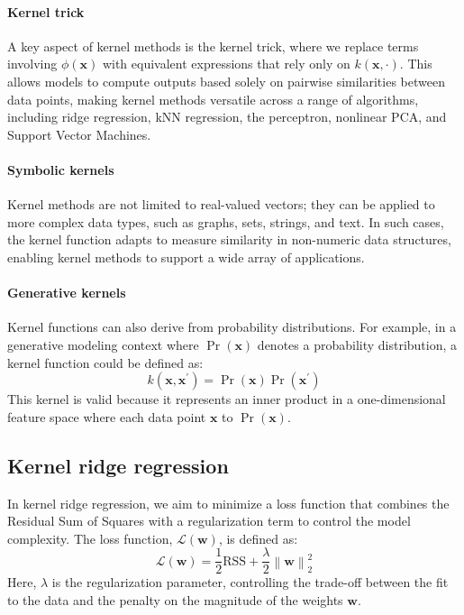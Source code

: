 \paragraph*{Kernel trick}
A key aspect of kernel methods is the kernel trick, where we replace terms involving $\phi(\mathbf{x})$ with equivalent expressions that rely only on $k(\mathbf{x},\cdot)$.
This allows models to compute outputs based solely on pairwise similarities between data points, making kernel methods versatile across a range of algorithms, including ridge regression, kNN regression, the perceptron, nonlinear PCA, and Support Vector Machines.

\paragraph*{Symbolic kernels}
Kernel methods are not limited to real-valued vectors; they can be applied to more complex data types, such as graphs, sets, strings, and text. In such cases, the kernel function adapts to measure similarity in non-numeric data structures, enabling kernel methods to support a wide array of applications.

\paragraph*{Generative kernels}
Kernel functions can also derive from probability distributions. 
For example, in a generative modeling context where $\Pr(\mathbf{x})$ denotes a probability distribution, a kernel function could be defined as:
\[k(\mathbf{x},\mathbf{x}^\prime)=\Pr(\mathbf{x})\Pr(\mathbf{x}^\prime)\]
This kernel is valid because it represents an inner product in a one-dimensional feature space where each data point $\mathbf{x}$ to $\Pr(\mathbf{x})$. 

\subsection{Kernel ridge regression}
In kernel ridge regression, we aim to minimize a loss function that combines the Residual Sum of Squares with a regularization term to control the model complexity.
The loss function, $\mathcal{L}(\mathbf{w})$, is defined as:
\[\mathcal{L}(\mathbf{w})=\dfrac{1}{2}\text{RSS}+\dfrac{\lambda}{2}{\left\lVert \mathbf{w}\right\rVert}_2^2\]
Here, $\lambda$ is the regularization parameter, controlling the trade-off between the fit to the data and the penalty on the magnitude of the weights $\mathbf{w}$. 

